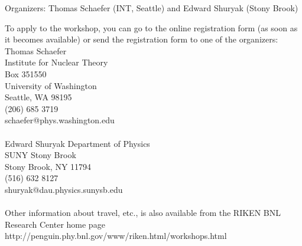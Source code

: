 Organizers: Thomas Schaefer (INT, Seattle) and Edward Shuryak (Stony
Brook) 

\newpage
\noindent
To apply to the workshop, you can go to the online registration form
(as soon as it becomes available) or send the registration form to 
one of the organizers: \\ 

\noindent
Thomas Schaefer\\
Institute for Nuclear Theory\\
Box 351550\\
University of Washington\\
Seattle, WA 98195\\
(206) 685 3719 \\
schaefer@phys.washington.edu\\ \\ 

\noindent
Edward Shuryak
Department of Physics\\
SUNY Stony Brook\\
Stony Brook, NY 11794\\
(516) 632 8127 \\
shuryak@dau.physics.sunysb.edu\\ \\

\noindent
Other information about travel, etc., is also available from the RIKEN
BNL Research Center home page 
http://penguin.phy.bnl.gov/www/riken.html/workshops.html


